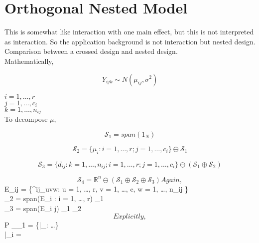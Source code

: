 \documentclass[11pt,fleqn]{book} %
\begin{document}
\section{Orthogonal Nested Model}

This is somewhat like interaction with one main effect, but this is not interpreted as interaction. So the application background is not interaction but nested design. \\


Comparison between a crossed design and nested design. \\ 


Mathematically, 

		$$Y_{ijk} \sim N(\mu_{ij}, \sigma^2) $$

$i = 1, \dots, r$\\
$j = 1, \dots, c_i$\\
$k = 1, \dots, n_{ij}$\\

To decompose $\mu$, 


	$$\mathcal{S}_1 = span(1_N) $$

	$$\mathcal{S}_2 = \{\mu_{i}: i = 1, \dots, r; j = 1, \dots, c_i  \} \ominus \mathcal{S}_1 $$

	$$\mathcal{S}_3 = \{d_{ij}: k = 1, \dots, n_{ij}; i = 1, \dots, r; j = 1, \dots, c_i  \} \ominus (\mathcal{S}_1 \oplus \mathcal{S}_2) $$

	$$\mathcal{S}_4 = \mathbb{R}^n \ominus (\mathcal{S}_1 \oplus \mathcal{S}_2 \oplus \mathcal{S}_3)


Again, 

		$$E_{ij} = \{\delta^{ij}_{uvw}: u = 1, \dots, r, v = 1, \dots, c, w = 1, \dots, n_{ij}  \} $$	


		$$_2 = span(E_{i\cdot} : i = 1, \dots, r) \ominus {}_1 $$ 

		$$_3 = span(E_{i j}) \ominus {}_1 \ominus {}_2 $$ 

Explicitly, 

		$$ P _{_1} \mu = \{\bar{\mu}_{\cdot \cdot}: \dots \}$$

		$$ \bar{\mu}_{i \cdot} = \theta $$



\end{document}
